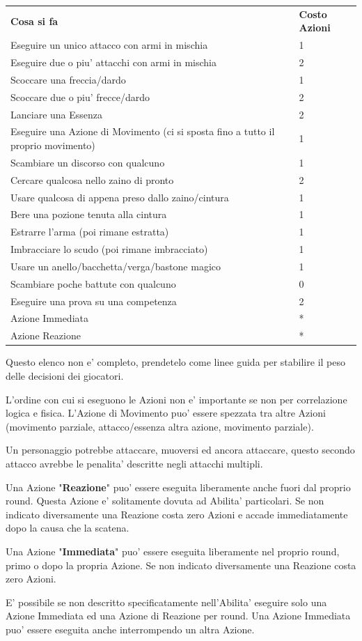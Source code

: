 \documentclass[a4paper,11pt,twoside,openany]{book}
\begin{document}
\begin{tabular}{ll}
\toprule
\textbf{Cosa si fa} & \textbf{Costo Azioni}\tabularnewline
Eseguire un unico attacco con armi in mischia & 1\tabularnewline
Eseguire due o piu' attacchi con armi in mischia & 2\tabularnewline
Scoccare una freccia/dardo & 1\tabularnewline
Scoccare due o piu' frecce/dardo & 2\tabularnewline
Lanciare una Essenza & 2\tabularnewline
Eseguire una Azione di Movimento (ci si sposta fino a tutto
il proprio movimento) & 1\tabularnewline
Scambiare un discorso con qualcuno & 1\tabularnewline
Cercare qualcosa nello zaino di pronto & 2\tabularnewline
Usare qualcosa di appena preso dallo zaino/cintura & 1\tabularnewline
Bere una pozione tenuta alla cintura & 1\tabularnewline
Estrarre l'arma (poi rimane estratta) & 1\tabularnewline
Imbracciare lo scudo (poi rimane imbracciato) & 1\tabularnewline
Usare un anello/bacchetta/verga/bastone magico & 1\tabularnewline
Scambiare poche battute con qualcuno & 0\tabularnewline
Eseguire una prova su una competenza & 2\tabularnewline
Azione Immediata & {*}\tabularnewline
Azione Reazione & {*}\tabularnewline

\end{tabular}

\smallskip

Questo elenco non e' completo, prendetelo come linee guida per stabilire il peso delle decisioni dei giocatori.

\bigskip

L'ordine con cui si eseguono le Azioni non e' importante se non per correlazione logica e fisica. L'Azione di Movimento puo' essere spezzata tra altre Azioni (movimento parziale, attacco/essenza altra azione, movimento parziale).

Un personaggio potrebbe attaccare, muoversi ed ancora attaccare, questo secondo attacco avrebbe le penalita' descritte negli attacchi multipli.
\smallskip

Una Azione "\textbf{Reazione}" puo' essere eseguita liberamente anche fuori dal proprio round. Questa Azione e' solitamente dovuta ad Abilita' particolari. Se non indicato diversamente una Reazione costa zero Azioni e accade immediatamente dopo la causa che la scatena.
\smallskip

Una Azione "\textbf{Immediata}" puo' essere eseguita liberamente nel proprio round, primo o dopo la propria Azione. Se non indicato diversamente una Reazione costa zero Azioni.

E' possibile se non descritto specificatamente nell'Abilita' eseguire solo una Azione Immediata ed una Azione di Reazione per round. Una Azione Immediata puo' essere eseguita anche interrompendo un altra Azione.
\end{document}
